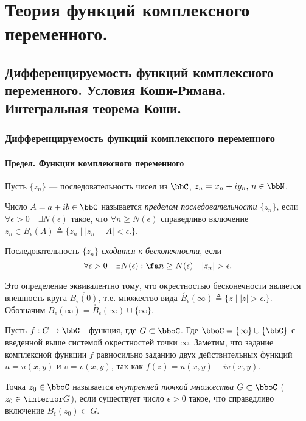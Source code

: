 \part[Теория функций комплексного переменного.]{Теория функций комплексного переменного.}%

\chapter[Дифференцируемость функций комплексного переменного. Условия Коши-Римана. Интегральная теорема Коши.]{Дифференцируемость функций комплексного переменного. Условия Коши-Римана. Интегральная теорема Коши.}
\section{Дифференцируемость функций комплексного переменного}

\subsection{Предел. Функции комплексного переменного}
Пусть $\{z_n\}$ --- последовательность чисел из $\bbC$, $z_n=x_n+iy_n, \, n \in \bbN$. 
\begin{defn}
Число $A = a+ib \in \bbC$ называется \textit{пределом последовательности} $\{z_n\}$, если $\forall \epsilon > 0\quad \exists N(\epsilon)$ такое, что $\forall n \ge N(\epsilon) $ справедливо включение $z_n \in B_\epsilon(A) \triangleq \{z_n \;\bigl|\; |z_n-A|<\epsilon \bigl.\}$.
\end{defn}
\begin{defn}
Последовательность $\{z_n\}$ \textit{сходится к бесконечности}, если 
$$
\forall \epsilon > 0\quad \exists N(\epsilon): \fa n \ge N(\epsilon) \quad |z_n|>\epsilon.
$$
\end{defn} 
Это определение эквивалентно тому, что окрестностью бесконечности является внешность круга $\overline{B_\epsilon(0)}$, т.е. множество вида $\overset{\circ} {B}_\epsilon(\infty)\triangleq \{z \;\bigl|\; |z|>\epsilon \bigl.\}$. Обозначим $B_\epsilon(\infty)=\overset{\circ} {B}_\epsilon(\infty) \cup\{\infty\}$.

Пусть $f: G\to \bbC$ - функция, где $G \subset \bboC$. Где ${\bboC =\{\infty\} \cup \{\bbC\}}$ с введенной выше системой окрестностей точки $\infty$. Заметим, что задание комплексной функции $f$ равносильно заданию двух действительных функций $u=u(x,y)$ и $v=v(x,y)$, так как $f(z)=u(x,y)+iv(x,y)$.
\begin{defn}
Точка $z_0 \in \bboC$ называется \textit{внутренней точкой множества} $G \subset \bboC$ ($z_0 \in \interior G$), если существует число $\epsilon > 0$ такое, что справедливо включение $B_\epsilon (z_0) \subset G$.
\end{defn} 

